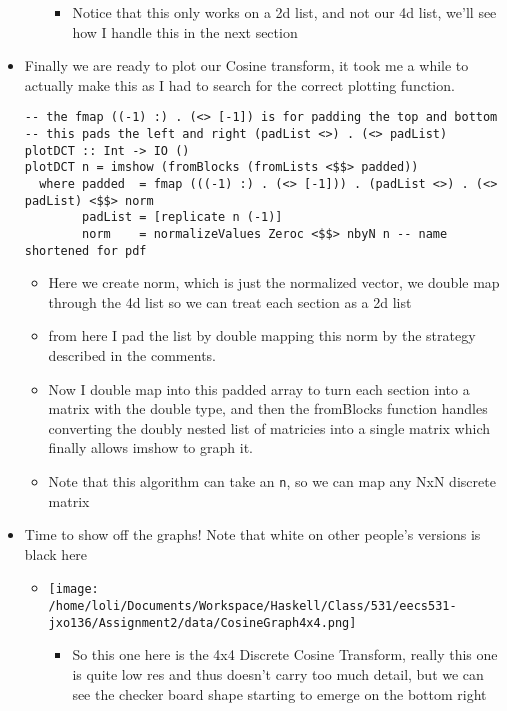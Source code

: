 \documentclass{article}
\begin{document}
\begin{itemize}
\begin{itemize}
\begin{itemize}
\item Notice that this only works on a 2d list, and not our 4d list, we'll
see how I handle this in the next section
\end{itemize}
\end{itemize}
\item Finally we are ready to plot our Cosine transform, it took me a
while to actually make this as Ι had to search for the correct
plotting function.
\begin{verbatim}
-- the fmap ((-1) :) . (<> [-1]) is for padding the top and bottom
-- this pads the left and right (padList <>) . (<> padList)
plotDCT :: Int -> IO ()
plotDCT n = imshow (fromBlocks (fromLists <$$> padded))
  where padded  = fmap (((-1) :) . (<> [-1])) . (padList <>) . (<> padList) <$$> norm
        padList = [replicate n (-1)]
        norm    = normalizeValues Zeroc <$$> nbyN n -- name shortened for pdf
\end{verbatim}
\begin{itemize}
\item Here we create norm, which is just the normalized vector, we
double map through the 4d list so we can treat each section as a
2d list
\item from here Ι pad the list by double mapping this norm by the
strategy described in the comments.
\item Now I double map into this padded array to turn each section into
a matrix with the double type, and then the fromBlocks function
handles converting the doubly nested list of matricies into a
single matrix which finally allows imshow to graph it.
\item Note that this algorithm can take an \texttt{n}, so we can map any NxN
discrete matrix
\end{itemize}
\item Time to show off the graphs! Note that white on other people's
versions is black here
\begin{itemize}
\item \texttt{[image: /home/loli/Documents/Workspace/Haskell/Class/531/eecs531-jxo136/Assignment2/data/CosineGraph4x4.png]}

\begin{itemize}
\item So this one here is the 4x4 Discrete Cosine Transform, really
this one is quite low res and thus doesn't carry too much detail,
but we can see the checker board shape starting to emerge on the
bottom right
\end{itemize}


\end{itemize}
\end{itemize}
\end{document}
